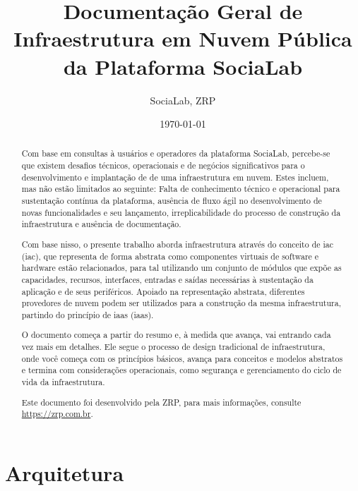 \documentclass[12pt, a4paper]{report}
\begin{document}

\title{Documentação Geral de Infraestrutura em Nuvem Pública da Plataforma SociaLab}
\author{SociaLab, ZRP}
\date{\today}


\maketitle{}

\begin{abstract}
	Com base em consultas à usuários e operadores da plataforma SociaLab, percebe-se que existem desafios técnicos, operacionais e de negócios significativos para o desenvolvimento e implantação de de uma infraestrutura em nuvem. Estes incluem, mas não estão limitados ao seguinte: Falta de conhecimento técnico e operacional para sustentação contínua da plataforma, ausência de fluxo ágil no desenvolvimento de novas funcionalidades e seu lançamento, irreplicabilidade do processo de construção da infraestrutura e ausência de documentação.

	Com base nisso, o presente trabalho aborda infraestrutura através do conceito de \acrlong{iac} (\acrshort{iac}), que representa de forma abstrata como componentes virtuais de software e hardware estão relacionados, para tal utilizando um conjunto de módulos que expõe as capacidades, recursos, interfaces, entradas e saídas necessárias à sustentação da aplicação e de seus periféricos. Apoiado na representação abstrata, diferentes provedores de nuvem podem ser utilizados para a construção da mesma infraestrutura, partindo do princípio de \acrlong{iaas} (\acrshort{iaas}).

	O documento começa a partir do resumo e, à medida que avança, vai entrando cada vez mais em detalhes. Ele segue o processo de design tradicional de infraestrutura, onde você começa com os princípios básicos, avança para conceitos e modelos abstratos e termina com considerações operacionais, como segurança e gerenciamento do ciclo de vida da infraestrutura.

	Este documento foi desenvolvido pela ZRP, para mais informações, consulte \url{https://zrp.com.br}.
\end{abstract}


\tableofcontents{}
\listoftables
\listoffigures
\printglossary{}

\printglossary[type=\acronymtype]

\chapter{Arquitetura}
\end{document}
